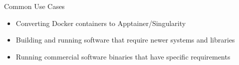 \begin{frame}{Common Use Cases}
\begin{itemize}
\item Converting Docker containers to Apptainer/Singularity
\item Building and running software that require newer systems and libraries 
\item Running commercial software binaries that have specific requirements
\end{itemize}
\end{frame}

